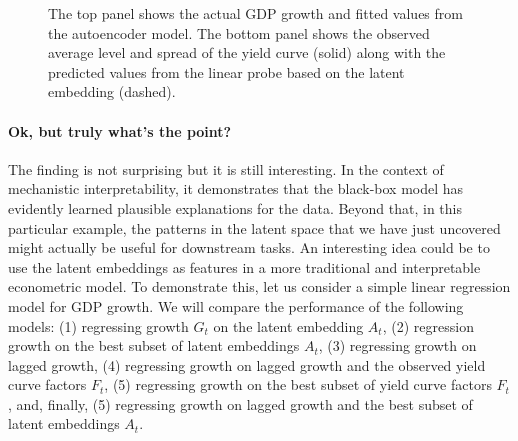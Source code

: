 \documentclass[
  letterpaper,
  DIV=11,
  numbers=noendperiod]{scrartcl}
\let\oldparagraph\paragraph
\renewcommand{\paragraph}[1]{\oldparagraph{#1}\mbox{}}
\theoremstyle{plain}
\theoremstyle{remark}
\begin{document}
\begin{figure}


\caption{\label{fig-dl-results}The top panel shows the actual GDP growth
and fitted values from the autoencoder model. The bottom panel shows the
observed average level and spread of the yield curve (solid) along with
the predicted values from the linear probe based on the latent embedding
(dashed).}

\end{figure}%

\paragraph{Ok, but truly what's the
point?}\label{ok-but-truly-whats-the-point}

The finding is not surprising but it is still interesting. In the
context of mechanistic interpretability, it demonstrates that the
black-box model has evidently learned plausible explanations for the
data. Beyond that, in this particular example, the patterns in the
latent space that we have just uncovered might actually be useful for
downstream tasks. An interesting idea could be to use the latent
embeddings as features in a more traditional and interpretable
econometric model. To demonstrate this, let us consider a simple linear
regression model for GDP growth. We will compare the performance of the
following models: (1) regressing growth \(G_t\) on the latent embedding
\(A_t\), (2) regression growth on the best subset of latent embeddings
\(A_t\), (3) regressing growth on lagged growth, (4) regressing growth
on lagged growth and the observed yield curve factors \(F_t\), (5)
regressing growth on the best subset of yield curve factors \(F_t\),
and, finally, (5) regressing growth on lagged growth and the best subset
of latent embeddings \(A_t\).
\end{document}
